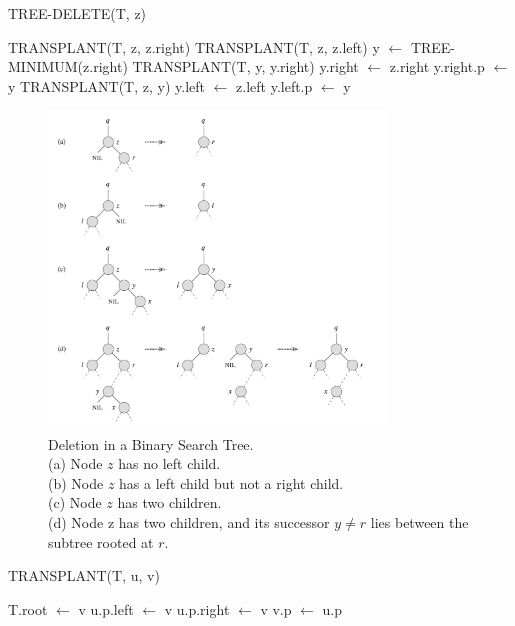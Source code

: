 \begin{algorithm}[H]
    \caption{TREE-DELETE(T, z)}
    \begin{algorithmic}[1]
            \State TRANSPLANT(T, z, z.right)
            \State TRANSPLANT(T, z, z.left)
        \Else
            \State y $\gets$ TREE-MINIMUM(z.right)
                \State TRANSPLANT(T, y, y.right)
                \State y.right $\gets$ z.right
                \State y.right.p $\gets$ y
            \EndIf
            \State TRANSPLANT(T, z, y)
            \State y.left $\gets$ z.left
            \State y.left.p $\gets$ y
        \EndIf
    \end{algorithmic}
\end{algorithm}

\begin{figure}[H]
    \centering
    \includegraphics[width=0.8\textwidth]{assets/deletion_bt.png}
    \caption{Deletion in a Binary Search Tree.\\(a) Node $z$ has no left child.\\(b) Node $z$ has a left child but not a right child.\\(c) Node $z$ has two children.\\(d) Node z has two children, and its successor $y \neq r$ lies between the subtree rooted at $r$.}
\end{figure}

\begin{algorithm}[H]
    \caption{TRANSPLANT(T, u, v)}
    \begin{algorithmic}[1]
            \State T.root $\gets$ v
            \State u.p.left $\gets$ v
        \Else
            \State u.p.right $\gets$ v
        \EndIf
            \State v.p $\gets$ u.p
        \EndIf
    \end{algorithmic}
\end{algorithm}

